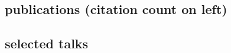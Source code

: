 \documentclass[]{luger-cv} %
\begin{document}
\begin{changemargin}{-4.5cm}{0cm}
\ifdefined \withpubs

    \section{publications {\footnotesize \normalfont (citation count on left)}}
\end{changemargin}
\begin{changemargin}{-4.1cm}{0cm}
    \begin{list}{}{\pubslist}
        
    \end{list}
    \vspace{1em}
\fi
\end{changemargin}
\begin{changemargin}{-4.5cm}{0cm}
\ifdefined \withtalks
    \section{selected talks}
    \begin{list}{}{\pubslist}
        
    \end{list}
\fi
\end{changemargin}
\end{document}
